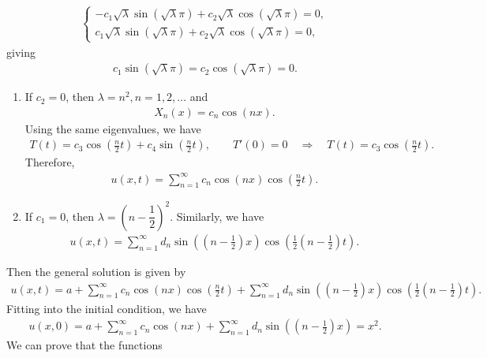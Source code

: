 \documentclass[12pt, a4paper]{article}
\begin{document}
\begin{spacing}{1.1}
\begin{itemize}
\begin{align*}
	\left\{
	\begin{array}{l}
	-c_1\sqrt{\lambda}\sin(\sqrt{\lambda}\pi) + c_2\sqrt{\lambda}\cos(\sqrt{\lambda}\pi) = 0, \\
	c_1\sqrt{\lambda}\sin(\sqrt{\lambda}\pi) + c_2\sqrt{\lambda}\cos(\sqrt{\lambda}\pi) = 0,
	\end{array}
	\right.
	\end{align*}
	giving
	\begin{align*}
	c_1\sin(\sqrt{\lambda}\pi) = c_2\cos(\sqrt{\lambda}\pi) = 0.
	\end{align*}
	\begin{enumerate}
		\item If $c_2 = 0$, then $\lambda = n^2, n = 1, 2, \ldots $ and 
		\begin{align*}
		X_n(x) = c_n\cos(nx).
		\end{align*}
		Using the same eigenvalues, we have 
		\begin{align*}
		T(t) = c_3\cos\left(\frac{n}{2}t\right) + c_4\sin\left(\frac{n}{2}t\right), \qquad T'(0) = 0 \quad\Rightarrow\quad T(t) = c_3\cos\left(\frac{n}{2}t\right).
		\end{align*}
		Therefore,
		\begin{align*}
		u(x, t) = \sum_{n=1}^{\infty} c_n\cos(nx)\cos\left(\frac{n}{2}t \right).
		\end{align*} 
		\item If $c_1 = 0$, then $\lambda = \left(n - \dfrac{1}{2} \right)^2$. Similarly, we have
		\begin{align*}
		u(x, t) = \sum_{n=1}^{\infty} d_n\sin\left(\left(n - \frac{1}{2} \right)x \right)\cos\left(\frac{1}{2}\left(n - \frac{1}{2}\right)t \right).
		\end{align*}
	\end{enumerate}
\end{itemize}
Then the general solution is given by
\begin{align*}
u(x, t) = a + \sum_{n=1}^{\infty}c_n\cos(nx)\cos\left(\frac{n}{2}t \right) + \sum_{n=1}^{\infty} d_n\sin\left(\left(n - \frac{1}{2} \right)x \right)\cos\left(\frac{1}{2}\left(n - \frac{1}{2} \right)t \right).
\end{align*}
Fitting into the initial condition, we have
\begin{align*}
u(x, 0) = a + \sum_{n=1}^{\infty}c_n\cos(nx) + \sum_{n=1}^{\infty} d_n\sin\left(\left(n - \frac{1}{2} \right)x \right) = x^2.
\end{align*}
We can prove that the functions
\begin{align*}

\end{align*}
\end{spacing}
\end{document}
